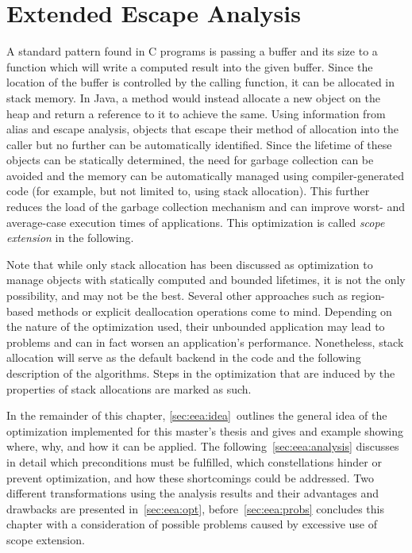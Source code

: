 
\chapter{Extended Escape Analysis}
	\label{chapter:eea}
	A standard pattern found in C programs is passing a buffer and its size to a function which will write a computed
	result into the given buffer. Since the location of the buffer is controlled by the calling function, it can be
	allocated in stack memory. In Java, a method would instead allocate a new object on the heap and return a reference to
	it to achieve the same. Using information from alias and escape analysis, objects that escape their method of
	allocation into the caller but no further can be automatically identified. Since the lifetime of these objects can be
	statically determined, the need for garbage collection can be avoided and the memory can be automatically managed
	using compiler-generated code (for example, but not limited to, using stack allocation). This further reduces the load
	of the garbage collection mechanism and can improve worst- and average-case execution times of applications. This
	optimization is called \emph{scope extension} in the following.

	Note that while only stack allocation has been discussed as optimization to manage objects with statically computed
	and bounded lifetimes, it is not the only possibility, and may not be the best. Several other approaches such as
	region-based methods or explicit deallocation operations come to mind. Depending on the nature of the optimization
	used, their unbounded application may lead to problems and can in fact worsen an application's performance.
	Nonetheless, stack allocation will serve as the default backend in the code and the following description of the
	algorithms. Steps in the optimization that are induced by the properties of stack allocations are marked as such.

	In the remainder of this chapter, \cref{sec:eea:idea}~outlines the general idea of the optimization implemented for
	this master's thesis and gives and example showing where, why, and how it can be applied. The
	following~\cref{sec:eea:analysis} discusses in detail which preconditions must be fulfilled, which constellations
	hinder or prevent optimization, and how these shortcomings could be addressed. Two different transformations using the
	analysis results and their advantages and drawbacks are presented in~\cref{sec:eea:opt}, before~\cref{sec:eea:probs}
	concludes this chapter with a consideration of possible problems caused by excessive use of scope extension.

